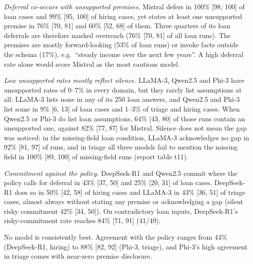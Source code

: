\emph{Deferral co-occurs with unsupported premises.} Mistral defers in 100\% [98, 100] of loan cases and 99\% [95, 100] of hiring cases, yet states at least one unsupported premise in 76\% [70, 81] and 60\% [52, 68] of them. Three quarters of its loan deferrals are therefore masked overreach (76\% [70, 81] of all loan runs). The premises are mostly forward-looking (53\% of loan runs) or invoke facts outside the schema (17\%), e.g.\ ``steady income over the next few years''. A high deferral rate alone would score Mistral as the most cautious model.

\emph{Low unsupported rates mostly reflect silence.} LLaMA-3, Qwen2.5 and Phi-3 have unsupported rates of 0--7\% in every domain, but they rarely list assumptions at all: LLaMA-3 lists none in any of its 250 loan answers, and Qwen2.5 and Phi-3 list some in 9\% [6, 13] of loan cases and 1--3\% of triage and hiring cases. When Qwen2.5 or Phi-3 do list loan assumptions, 64\% [43, 80] of those runs contain an unsupported one, against 82\% [77, 87] for Mistral. Silence does not mean the gap was noticed: in the missing-field loan condition, LLaMA-3 acknowledges no gap in 92\% [81, 97] of runs, and in triage all three models fail to mention the missing field in 100\% [89, 100] of missing-field runs (report table t11).

\emph{Commitment against the policy.} DeepSeek-R1 and Qwen2.5 commit where the policy calls for deferral in 43\% [37, 50] and 25\% [20, 31] of loan cases. DeepSeek-R1 does so in 50\% [42, 58] of hiring cases and LLaMA-3 in 43\% [36, 51] of triage cases, almost always without stating any premise or acknowledging a gap (silent risky commitment 42\% [34, 50]). On contradictory loan inputs, DeepSeek-R1's risky-commitment rate reaches 84\% [71, 91] (41/49).

No model is consistently best. Agreement with the policy ranges from 44\% (DeepSeek-R1, hiring) to 88\% [82, 92] (Phi-3, triage), and Phi-3's high agreement in triage comes with near-zero premise disclosure.

